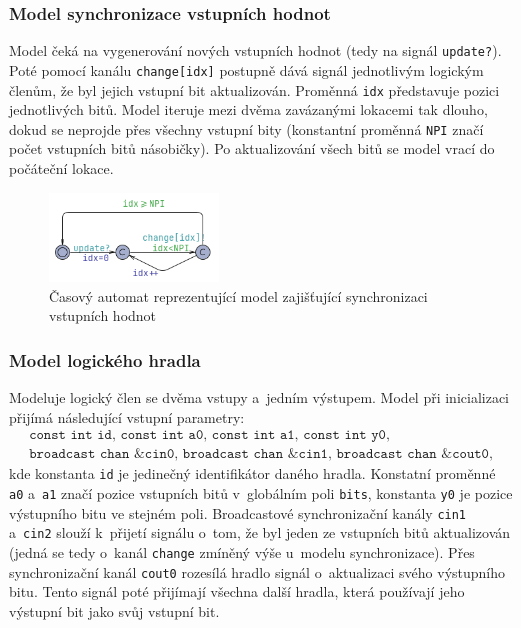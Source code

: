 \subsubsection{Model synchronizace vstupních hodnot}
Model čeká na vygenerování nových vstupních hodnot (tedy na signál \texttt{update?}). Poté pomocí kanálu \texttt{change[idx]} postupně dává signál jednotlivým logickým členům, že byl jejich vstupní bit aktualizován. Proměnná \texttt{idx} představuje pozici jednotlivých bitů. Model iteruje mezi dvěma zavázanými lokacemi tak dlouho, dokud se neprojde přes všechny vstupní bity (konstantní proměnná \texttt{NPI} značí počet vstupních bitů násobičky). Po aktualizování všech bitů se model vrací do počáteční lokace.

\begin{figure}[H]
    \centering
    \includegraphics[width=0.4\textwidth]{obrazky-figures/model_syncPrimary.png}
    \caption{Časový automat reprezentující model zajišťující synchronizaci vstupních hodnot}
    \label{fig:model_syncPrimary}
\end{figure}

\subsubsection{Model logického hradla}
Modeluje logický člen se dvěma vstupy a~jedním výstupem. Model při inicializaci přijímá následující vstupní parametry:
\begin{equation*}
    \begin{array}{l}
       \texttt{const int id, const int a0, const int a1, const int y0,} \\
       \texttt{broadcast chan \&cin0, broadcast chan \&cin1, broadcast chan \&cout0,}
    \end{array}
\end{equation*}
kde konstanta \texttt{id} je jedinečný identifikátor daného hradla. Konstatní proměnné \texttt{a0} a~\texttt{a1} značí pozice vstupních bitů v~globálním poli \texttt{bits}, konstanta \texttt{y0} je pozice výstupního bitu ve stejném poli. Broadcastové synchronizační kanály \texttt{cin1} a~\texttt{cin2} slouží k~přijetí signálu o~tom, že byl jeden ze vstupních bitů aktualizován (jedná se tedy o~kanál \texttt{change} zmíněný výše u~modelu synchronizace). Přes synchronizační kanál \texttt{cout0} rozesílá hradlo signál o~aktualizaci svého výstupního bitu. Tento signál poté přijímají všechna další hradla, která používají jeho výstupní bit jako svůj vstupní bit.

